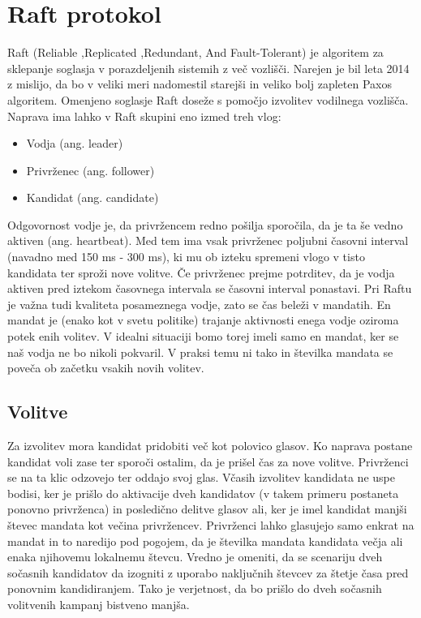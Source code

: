 \documentclass[runningheads]{llncs}
\begin{document}
\section{Raft protokol}
Raft (Reliable ,Replicated ,Redundant, And Fault-Tolerant) je algoritem za sklepanje soglasja v porazdeljenih sistemih z več vozlišči. Narejen je bil leta 2014 z mislijo, da bo v veliki meri nadomestil starejši in veliko bolj zapleten Paxos algoritem. Omenjeno soglasje Raft doseže s pomočjo izvolitev vodilnega vozlišča. Naprava ima lahko v Raft skupini eno izmed treh vlog: \\
\begin{itemize}
\item Vodja (ang. leader)
\item Privrženec (ang. follower)
\item Kandidat (ang. candidate)
\end{itemize}
Odgovornost vodje je, da privržencem redno pošilja sporočila, da je ta še vedno aktiven (ang. heartbeat). Med tem ima vsak privrženec poljubni časovni interval (navadno med 150 ms - 300 ms), ki mu ob izteku spremeni vlogo v tisto kandidata ter sproži nove volitve. Če privrženec prejme potrditev, da je vodja aktiven pred iztekom časovnega intervala se časovni interval ponastavi. Pri Raftu je važna tudi kvaliteta posameznega vodje, zato se čas beleži v mandatih. En mandat je (enako kot v svetu politike) trajanje aktivnosti enega vodje oziroma potek enih volitev. V idealni situaciji bomo torej imeli samo en mandat, ker se naš vodja ne bo nikoli pokvaril. V praksi temu ni tako in številka mandata se poveča ob začetku vsakih novih volitev. 
\subsection{Volitve} 
Za izvolitev mora kandidat pridobiti več kot polovico glasov. Ko naprava postane kandidat voli zase ter sporoči ostalim, da je prišel čas za nove volitve. Privrženci se na ta klic odzovejo ter oddajo svoj glas. Včasih izvolitev kandidata ne uspe bodisi, ker je prišlo do aktivacije dveh kandidatov (v takem primeru postaneta ponovno privrženca) in posledično delitve glasov ali, ker je imel kandidat manjši števec mandata kot večina privržencev. Privrženci lahko glasujejo samo enkrat na mandat in to naredijo pod pogojem, da je številka mandata kandidata večja ali enaka njihovemu lokalnemu števcu. Vredno je omeniti, da se scenariju dveh sočasnih kandidatov da izogniti z uporabo naključnih števcev za štetje časa pred ponovnim kandidiranjem. Tako je verjetnost, da bo prišlo do dveh sočasnih volitvenih kampanj bistveno manjša.
\end{document}
